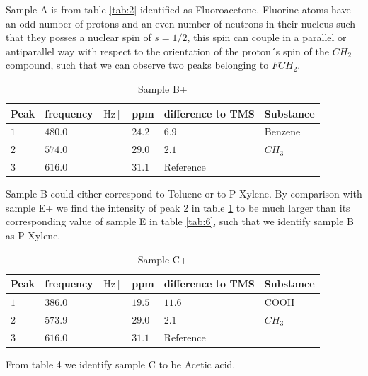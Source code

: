 \noindent
Sample A is from table \ref{tab:2} identified as Fluoroacetone. Fluorine atoms have an odd number of protons and an even number of neutrons in their nucleus such that they posses a nuclear spin of $s=1/2$, this spin can couple in a parallel or antiparallel way with respect to the orientation of the proton´s spin of the $CH_2$ compound, such that we can observe two peaks belonging to $FCH_2$.\cite{Fluorine}



\begin{table}[h]
	\centering
	\begin{tabular}{lllll}
		\toprule
		Peak & frequency $\left[\mathrm{Hz}\right]$ & ppm & difference to TMS & Substance \\
		\midrule
		$ 1$ & $480.0$ & $24.2$ & $6.9$ & Benzene\\
		
		$ 2$ & $574.0$ & $29.0$ &$ 2.1$ & $CH_3$\\
		
		$ 3$ & $616.0$ &$31.1$ & Reference & \\
		\bottomrule
	\end{tabular}
	\caption{Sample B+}
	\label{tab:3}
\end{table}
\noindent
Sample B could either correspond to Toluene or to P-Xylene. By comparison with sample E+ we find the intensity of peak 2 in table \ref{tab:3} to be much larger than its corresponding value of sample E in table \ref{tab:6}, such that we identify sample B as P-Xylene.


\begin{table}[h]
	\centering
	\begin{tabular}{lllll}
		\toprule
		Peak & frequency $\left[\mathrm{Hz}\right]$ & ppm & difference to TMS & Substance \\
		\midrule
		$ 1$ & $386.0$ & $19.5$ & $11.6$ & COOH\\
		
		$ 2$ & $573.9$ & $29.0$ &$ 2.1$ & $CH_3$\\
		
		$ 3$ & $616.0$ &$31.1$ & Reference & \\
		\bottomrule
	\end{tabular}
	\caption{Sample C+}
	\label{tab:4}
\end{table}
\noindent

From table 4 we identify sample C to be Acetic acid.

